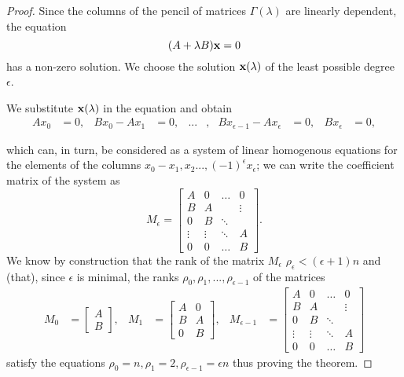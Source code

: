 \begin{proof}
    Since the columns of the pencil of matrices \(\Gamma(\lambda)\) are linearly dependent, the equation
    \[
        (A+\lambda B)\vb{x} = 0
    \]
    has a non-zero solution. We choose the solution \(\vb{x}(\lambda)\) of the least possible degree \(\epsilon\).

    We substitute \(\vb{x}(\lambda)\) in the equation and obtain
    \begin{align*}
        Ax_{0} &= 0, & Bx_{0} - Ax_{1} &= 0,
        & ...&, & Bx_{\epsilon-1} - Ax_{\epsilon} &= 0, &
        Bx_{\epsilon} &= 0,
    \end{align*}

    which can, in turn, be considered as a system of linear homogenous equations for the elements
    of the columns \(x_{0} - x_{1}, x_{2} ..., (-1)^\epsilon x_{\epsilon}\); we can write the coefficient
    matrix of the system as
    \[
        M_{\epsilon} =
        \begin{bmatrix}
            A & 0 & \hdots &    0   \\
            B & A &        & \vdots \\
            0 & B & \ddots & \\
            \vdots & \vdots & \ddots & A \\
            0      &    0   & \hdots & B
        \end{bmatrix}.
    \]
    We know by construction that the rank of the matrix \(M_{\epsilon}\) \(\rho_{\epsilon} < (\epsilon+1)n\)
    and (that), since \(\epsilon\) is minimal, the ranks \(\rho_{0}, \rho_{1}, ..., \rho_{\epsilon-1}\)
    of the matrices
    \begin{align*}
        M_{0} &=
        \begin{bmatrix}
            A \\
            B
        \end{bmatrix},
        & M_{1} &=
        \begin{bmatrix}
            A & 0 \\
            B & A \\
            0 & B
        \end{bmatrix},
        & M_{\epsilon-1} &=
        \begin{bmatrix}
            A & 0 & \hdots &    0   \\
            B & A &        & \vdots \\
            0 & B & \ddots & \\
            \vdots & \vdots & \ddots & A \\
            0      &    0   & \hdots & B
        \end{bmatrix}
    \end{align*}
    satisfy the equations \(\rho_{0} = n, \rho_{1} = 2, \rho_{\epsilon-1} = \epsilon n\) thus
    proving the theorem.
\end{proof}

